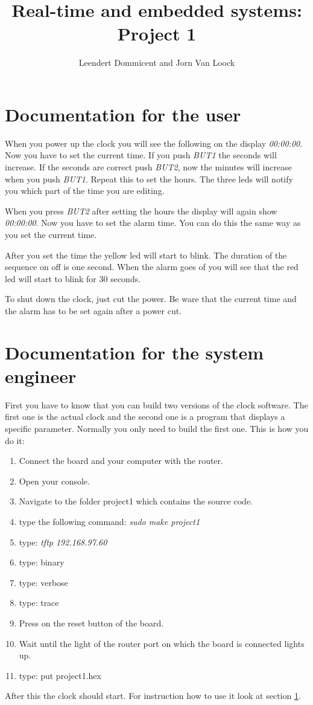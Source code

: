 \documentclass[a4]{article}
\title{Real-time and embedded systems: Project 1}
\author{Leendert Dommicent and Jorn Van Loock}
\begin{document}
\maketitle
\setlength{\parindent}{0px}
\setlength{\parskip}{8px}
\section{Documentation for the user}
\label{sec:user}
When you power up the clock you will see the following on the display \textit{00:00:00}. Now you have to set the current time. If you push \textit{BUT1} the seconds will increase. If the seconds are correct push \textit{BUT2}, now the minutes will increase when you push \textit{BUT1}. Repeat this to set the hours. The three leds will notify you which part of the time you are editing.\par
When you press \textit{BUT2} after setting the hours the display will again show \textit{00:00:00}. Now you have to set the alarm time. You can do this the same way as you set the current time. \par
After you set the time the yellow led will start to blink. The duration of the sequence on off is one second. When the alarm goes of you will see that the red led will start to blink for 30 seconds.\par
To shut down the clock, just cut the power. Be ware that the current time and the alarm has to be set again after a power cut.
\section{Documentation for the system engineer}
\label{sec:engineer}
First you have to know that you can build two versions of the clock software. The first one is the actual clock and the second one is a program that displays a specific parameter. Normally you only need to build the first one. This is how you do it:
\begin{enumerate}
\item Connect the board and your computer with the router.
\item Open your console.
\item Navigate to the folder project1 which contains the source code.
\item type the following command: \textit{sudo make project1}
\label{itm:command}
\item type: \textit{tftp 192.168.97.60}
\item type: binary
\item type: verbose
\item type: trace
\item Press on the reset button of the board.
\item Wait until the light of the router port on which the board is connected lights up.
\item type: put project1.hex
\end{enumerate}
After this the clock should start. For instruction how to use it look at section \ref{sec:user}.
\end{document}
